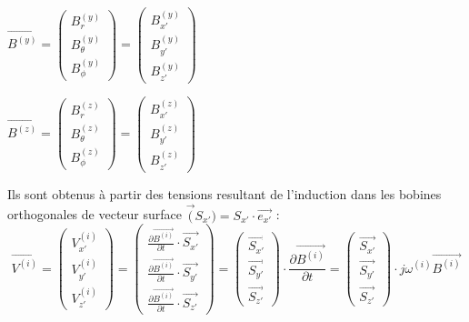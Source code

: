\documentclass[a4paper,11pt]{article}
\begin{document}
$\vec{B^{(y)}}
=
\left(
  \begin{array}{ c }
    B^{(y)}_{r} \\
    B^{(y)}_{\theta} \\
    B^{(y)}_{\phi}
  \end{array} \right)
=
\left(
  \begin{array}{ c }
    B^{(y)}_{x'} \\
    B^{(y)}_{y'} \\
    B^{(y)}_{z'}
  \end{array} \right)$ 

$\vec{B^{(z)}}
=
\left(
  \begin{array}{ c }
    B^{(z)}_{r} \\
    B^{(z)}_{\theta} \\
    B^{(z)}_{\phi}
  \end{array} \right)
=
\left(
  \begin{array}{ c }
    B^{(z)}_{x'} \\
    B^{(z)}_{y'} \\
    B^{(z)}_{z'}
  \end{array} \right)$

Ils sont obtenus à partir des tensions resultant de l'induction dans les bobines orthogonales de vecteur surface $\vec(S_{x'}) = S_{x'}\cdot \vec{e_{x'}}$ :
\[\vec{V^{(i)}}
=
\left(
  \begin{array}{ c }
    V^{(i)}_{x'} \\
    V^{(i)}_{y'} \\
    V^{(i)}_{z'}
  \end{array} 
\right)
=
\left(
  \begin{array}{ c }
    \frac{\partial\vec{B^{(i)}}}{\partial t} \cdot \vec{S_{x'}} \\
    \frac{\partial\vec{B^{(i)}}}{\partial t} \cdot \vec{S_{y'}} \\
    \frac{\partial\vec{B^{(i)}}}{\partial t} \cdot \vec{S_{z'}} 
  \end{array} 
\right)
=
\left(
  \begin{array}{ c }
    \vec{S_{x'}} \\
    \vec{S_{y'}} \\
    \vec{S_{z'}} 
  \end{array} 
\right)
\cdot
\frac{\partial\vec{B^{(i)}}}{\partial t}
=
\left(
  \begin{array}{ c }
    \vec{S_{x'}} \\
    \vec{S_{y'}} \\
    \vec{S_{z'}} 
  \end{array} 
\right)
\cdot
j \omega^{(i)} \vec{B^{(i)}}
\]
\end{document}
